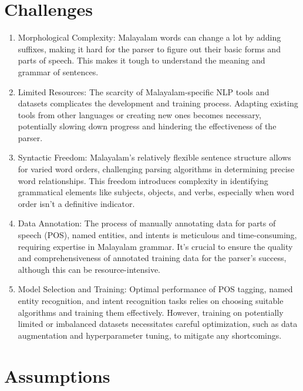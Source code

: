 \documentclass[12pt,a4paper,titlepage]{report}
\begin{document}
	\section{Challenges}
	\begin{enumerate}
		\item Morphological Complexity: Malayalam words can change a lot by adding suffixes, making it hard for the parser to figure out their basic forms and parts of speech. This makes it tough to understand the meaning and grammar of sentences.
		\item Limited Resources: The scarcity of Malayalam-specific NLP tools and datasets complicates the development and training process. Adapting existing tools from other languages or creating new ones becomes necessary, potentially slowing down progress and hindering the effectiveness of the parser.
		\item Syntactic Freedom: Malayalam's relatively flexible sentence structure allows for varied word orders, challenging parsing algorithms in determining precise word relationships. This freedom introduces complexity in identifying grammatical elements like subjects, objects, and verbs, especially when word order isn't a definitive indicator.
		\item Data Annotation: The process of manually annotating data for parts of speech (POS), named entities, and intents is meticulous and time-consuming, requiring expertise in Malayalam grammar. It's crucial to ensure the quality and comprehensiveness of annotated training data for the parser's success, although this can be resource-intensive.
		\item Model Selection and Training: Optimal performance of POS tagging, named entity recognition, and intent recognition tasks relies on choosing suitable algorithms and training them effectively. However, training on potentially limited or imbalanced datasets necessitates careful optimization, such as data augmentation and hyperparameter tuning, to mitigate any shortcomings. 
	\end{enumerate}
	
	
	
	
	\section{Assumptions}
	
\end{document}
